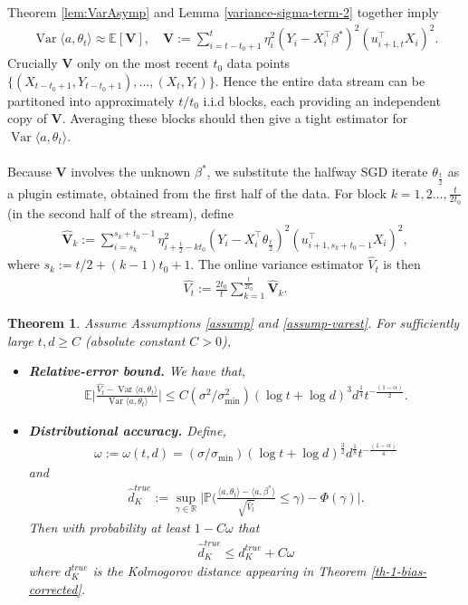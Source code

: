 \documentclass[11pt, reqno,english]{amsart}
\DeclareMathOperator{\Var}{Var} \DeclareMathOperator{\N}{N}
\newtheorem{theorem}{Theorem}[section]
\begin{document}
Theorem \ref{lem:VarAsymp} and Lemma \ref{variance-sigma-term-2} together imply
\begin{align*}
    \Var \langle a, \theta_t \rangle \approx \mathbb{E}[\mathbf{V}], \quad \mathbf{V} := \sum_{i = t-t_0 + 1}^{t} \eta^2_i (Y_i - X^\top_i \beta^*)^2(u^\top_{i+1,t} X_i)^2  .
\end{align*}
Crucially $\mathbf{V}$ only on the most recent $t_0$ data points $\{(X_{t-t_0 + 1}, Y_{t-t_0 + 1}), \dots, (X_t, Y_t)\}$. Hence the entire data stream can be partitoned into approximately $t/t_0$ i.i.d blocks, each providing an independent copy of $\mathbf{V}$. Averaging these blocks should then give a tight estimator for $\Var \langle a, \theta_t \rangle$. 
\\\\
Because $\mathbf{V}$ involves the unknown $\beta^*$, we substitute the halfway SGD iterate $\theta_{\frac{t}{2}}$ as a plugin estimate, obtained from the first half of the data. For block $k = 1,2 \dots ,\frac{t}{2t_0}$ (in the second half of the stream), define
\begin{align*}
    \hat{\mathbf{V}}_{k} := \sum_{i = s_k}^{s_k + t_0 - 1}  \eta^2_{i + \frac{t}{2} - kt_0} (Y_i - X^\top_i \theta_{\frac{t}{2}})^2 (u^\top_{i+1, s_k + t_0 - 1}X_i)^2,
\end{align*}
where $s_k := t/2 + (k-1)t_0 + 1$. 
The online variance estimator $\hat{V}_t$ is then
\begin{align*}
    \hat{V_t} := \frac{2t_0}{t}\sum_{k = 1}^{\frac{t}{2t_0}} \hat{\mathbf{V}}_k.
\end{align*}
\begin{theorem}\label{varestmainthm}
Assume Assumptions \ref{assump} and \ref{assump-varest}. 
For sufficiently large $t,d \geq C$ (absolute constant $C > 0$),
\begin{itemize}
    \item \textbf{Relative-error bound.} We have that,
\begin{align*}
    \mathbb{E}\bigg|\frac{\hat{V_t} - \Var \langle a, \theta_t \rangle}{\Var \langle a, \theta_t \rangle}\bigg| \leq C(\sigma^2/\sigma^2_{\min})(\log t + \log d)^3d^{\frac{1}{4}}t^{-\frac{(1 - \alpha)}{2}}.
     \end{align*}
     \item \textbf{Distributional accuracy.} Define,
\begin{align*}
    \omega :=  \omega(t,d) = (\sigma/\sigma_{\min})(\log t + \log d)^{\frac{3}{2}}d^{\frac{1}{8}}t^{-\frac{(1 - \alpha)}{4}}
\end{align*}
and 
\begin{align*}
    \hat{d}^{true}_{K} := \sup_{\gamma \in \mathbb{R}} \bigg|\mathbb{P}\bigg(\frac{\langle a, \theta_t \rangle - \langle a, \beta^* \rangle}{\sqrt{\hat{V}_t}}\leq \gamma\bigg) - \Phi(\gamma)\bigg|.
\end{align*}
Then with probability at least $1 - C\omega$ that
\begin{align*}
\hat{d}^{true}_{K} \leq d^{true}_{K} + C\omega
\end{align*}
where $d^{true}_{K}$ is the Kolmogorov distance appearing in Theorem \ref{th-1-bias-corrected}. 
\end{itemize}
\end{theorem}
\end{document}
